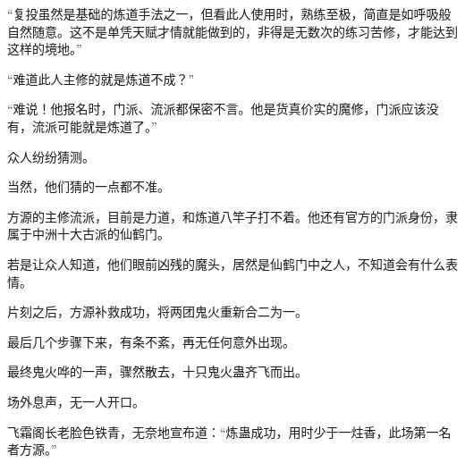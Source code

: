 \begin{this_body}
“复投虽然是基础的炼道手法之一，但看此人使用时，熟练至极，简直是如呼吸般自然随意。这不是单凭天赋才情就能做到的，非得是无数次的练习苦修，才能达到这样的境地。”

“难道此人主修的就是炼道不成？”

“难说！他报名时，门派、流派都保密不言。他是货真价实的魔修，门派应该没有，流派可能就是炼道了。”

众人纷纷猜测。

当然，他们猜的一点都不准。

方源的主修流派，目前是力道，和炼道八竿子打不着。他还有官方的门派身份，隶属于中洲十大古派的仙鹤门。

若是让众人知道，他们眼前凶残的魔头，居然是仙鹤门中之人，不知道会有什么表情。

片刻之后，方源补救成功，将两团鬼火重新合二为一。

最后几个步骤下来，有条不紊，再无任何意外出现。

最终鬼火哗的一声，骤然散去，十只鬼火蛊齐飞而出。

场外息声，无一人开口。

飞霜阁长老脸色铁青，无奈地宣布道：“炼蛊成功，用时少于一炷香，此场第一名者方源。”

\end{this_body}

